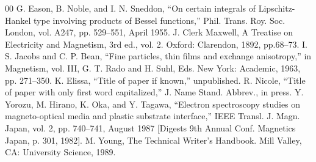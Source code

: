\documentclass[conference]{IEEEtran}
\begin{document}
\begin{thebibliography}{00}
 G. Eason, B. Noble, and I. N. Sneddon, ``On certain integrals of Lipschitz-Hankel type involving products of Bessel functions,'' Phil. Trans. Roy. Soc. London, vol. A247, pp. 529--551, April 1955.
 J. Clerk Maxwell, A Treatise on Electricity and Magnetism, 3rd ed., vol. 2. Oxford: Clarendon, 1892, pp.68--73.
 I. S. Jacobs and C. P. Bean, ``Fine particles, thin films and exchange anisotropy,'' in Magnetism, vol. III, G. T. Rado and H. Suhl, Eds. New York: Academic, 1963, pp. 271--350.
 K. Elissa, ``Title of paper if known,'' unpublished.
 R. Nicole, ``Title of paper with only first word capitalized,'' J. Name Stand. Abbrev., in press.
 Y. Yorozu, M. Hirano, K. Oka, and Y. Tagawa, ``Electron spectroscopy studies on magneto-optical media and plastic substrate interface,'' IEEE Transl. J. Magn. Japan, vol. 2, pp. 740--741, August 1987 [Digests 9th Annual Conf. Magnetics Japan, p. 301, 1982].
 M. Young, The Technical Writer's Handbook. Mill Valley, CA: University Science, 1989.
\end{thebibliography}
\vspace{12pt}
\color{red}
\end{document}
